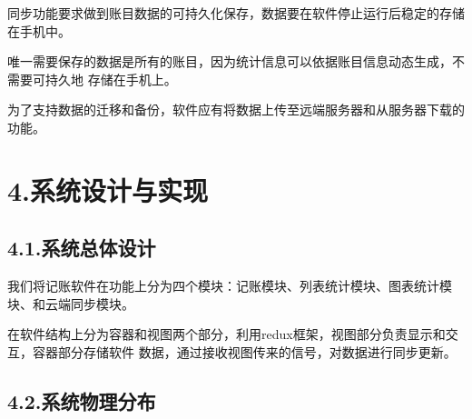 \documentclass{article}
\begin{document}
\noindent{}同步功能要求做到账目数据的可持久化保存，数据要在软件停止运行后稳定的存储在手机中。%

唯一需要保存的数据是所有的账目，因为统计信息可以依据账目信息动态生成，不需要可持久地
存储在手机上。%

为了支持数据的迁移和备份，软件应有将数据上传至远端服务器和从服务器下载的功能。%

\section{4.\hspace*{0.5em}系统设计与实现}\label{section}%

\subsection{4.1.\hspace*{0.5em}系统总体设计}\label{section}%

\noindent{}我们将记账软件在功能上分为四个模块：记账模块、列表统计模块、图表统计模块、和云端同步模块。%

在软件结构上分为容器和视图两个部分，利用redux框架，视图部分负责显示和交互，容器部分存储软件
数据，通过接收视图传来的信号，对数据进行同步更新。%

\subsection{4.2.\hspace*{0.5em}系统物理分布}\label{section}%
\end{document}
